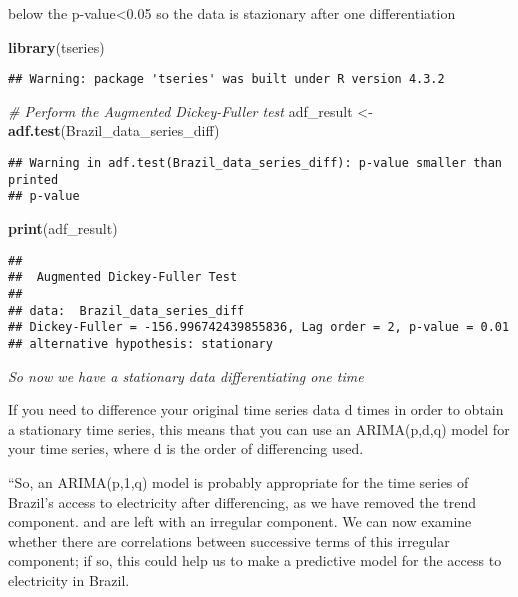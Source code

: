 \documentclass[
]{article}
\newenvironment{Shaded}{\begin{snugshade}}{\end{snugshade}}
\newcommand{\CommentTok}[1]{\textcolor[rgb]{0.56,0.35,0.01}{\textit{#1}}}
\newcommand{\FunctionTok}[1]{\textcolor[rgb]{0.13,0.29,0.53}{\textbf{#1}}}
\newcommand{\NormalTok}[1]{#1}
\newcommand{\OtherTok}[1]{\textcolor[rgb]{0.56,0.35,0.01}{#1}}
\begin{document}
below the p-value\textless0.05 so the data is stazionary after one
differentiation

\begin{Shaded}
\begin{Highlighting}[]
\FunctionTok{library}\NormalTok{(tseries)}
\end{Highlighting}
\end{Shaded}

\begin{verbatim}
## Warning: package 'tseries' was built under R version 4.3.2
\end{verbatim}

\begin{Shaded}
\begin{Highlighting}[]
\CommentTok{\# Perform the Augmented Dickey{-}Fuller test}
\NormalTok{adf\_result }\OtherTok{\textless{}{-}} \FunctionTok{adf.test}\NormalTok{(Brazil\_data\_series\_diff)}
\end{Highlighting}
\end{Shaded}

\begin{verbatim}
## Warning in adf.test(Brazil_data_series_diff): p-value smaller than printed
## p-value
\end{verbatim}

\begin{Shaded}
\begin{Highlighting}[]
\FunctionTok{print}\NormalTok{(adf\_result)}
\end{Highlighting}
\end{Shaded}

\begin{verbatim}
## 
##  Augmented Dickey-Fuller Test
## 
## data:  Brazil_data_series_diff
## Dickey-Fuller = -156.996742439855836, Lag order = 2, p-value = 0.01
## alternative hypothesis: stationary
\end{verbatim}

\emph{So now we have a stationary data differentiating one time}

If you need to difference your original time series data d times in
order to obtain a stationary time series, this means that you can use an
ARIMA(p,d,q) model for your time series, where d is the order of
differencing used.

``So, an ARIMA(p,1,q) model is probably appropriate for the time series
of Brazil's access to electricity after differencing, as we have removed
the trend component. and are left with an irregular component. We can
now examine whether there are correlations between successive terms of
this irregular component; if so, this could help us to make a predictive
model for the access to electricity in Brazil.
\end{document}
